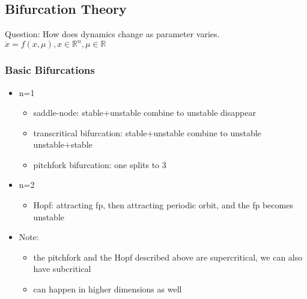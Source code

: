 \documentclass[10pt,a4paper]{article}
\begin{document}
\subsection{Bifurcation Theory}
Question: How does dynamics change as parameter varies.\\
$\dot{x}=f(x,\mu),x\in\mathbb{R}^n,\mu\in\mathbb{R}$

\subsubsection{Basic Bifurcations}
\begin{itemize}
	\item n=1
	\begin{itemize}
		\item saddle-node: stable+unstable \textrightarrow  combine to unstable \textrightarrow  disappear
		\item transcritical bifurcation: stable+unstable \textrightarrow  combine to unstable \textrightarrow  unstable+stable
		\item pitchfork bifurcation: one splits to 3
	\end{itemize}
	\item n=2
	\begin{itemize}
		\item Hopf: attracting fp, then attracting periodic orbit, and the fp becomes unstable
	\end{itemize}
	\item Note:
	\begin{itemize}
		\item the pitchfork and the Hopf described above are supercritical, we can also have subcritical
		\item can happen in higher dimensions as well
	\end{itemize}
	
\end{itemize}
\end{document}
